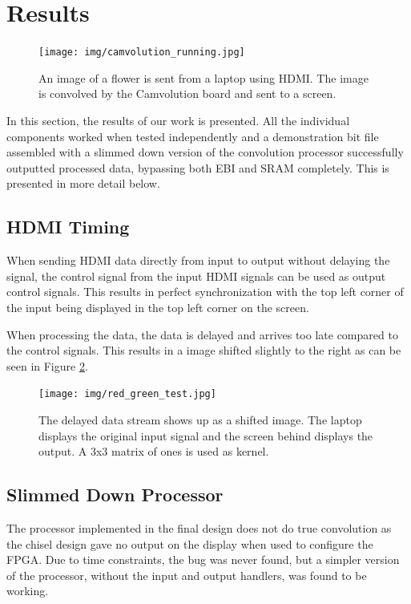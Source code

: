 \section{Results}

\begin{figure}
    \centering
    \texttt{[image: img/camvolution\_running.jpg]}
    \caption[The implemented system running.]{
        An image of a flower is sent from a laptop using HDMI.
				The image is convolved by the Camvolution board and sent to a screen.
    }
    \label{fig:systemRunning}
\end{figure}

In this section, the results of our work is presented.
All the individual components worked when tested independently and a demonstration bit file assembled with a slimmed down version of the convolution processor successfully outputted processed data, bypassing both EBI and SRAM completely.
This is presented in more detail below.

\subsection{HDMI Timing}
When sending HDMI data directly from input to output without delaying the signal, the control signal from the input HDMI signals can be used as output control signals.
This results in perfect synchronization with the top left corner of the input being displayed in the top left corner on the screen.

When processing the data, the data is delayed and arrives too late compared to the control signals. This results in a image shifted slightly to the right as can be seen in Figure \ref{fig:SyncDelay}.

\begin{figure}
    \centering
    \texttt{[image: img/red\_green\_test.jpg]}
    \caption[The delayed data stream.]{
        The delayed data stream shows up as a shifted image.
        The laptop displays the original input signal and the screen behind displays the output.
        A 3x3 matrix of ones is used as kernel.
    }
    \label{fig:SyncDelay}
\end{figure}

\subsection{Slimmed Down Processor}
The processor implemented in the final design does not do true convolution as the chisel design gave no output on the display when used to configure the FPGA.
Due to time constraints, the bug was never found, but a simpler version of the processor, without the input and output handlers, was found to be working.


